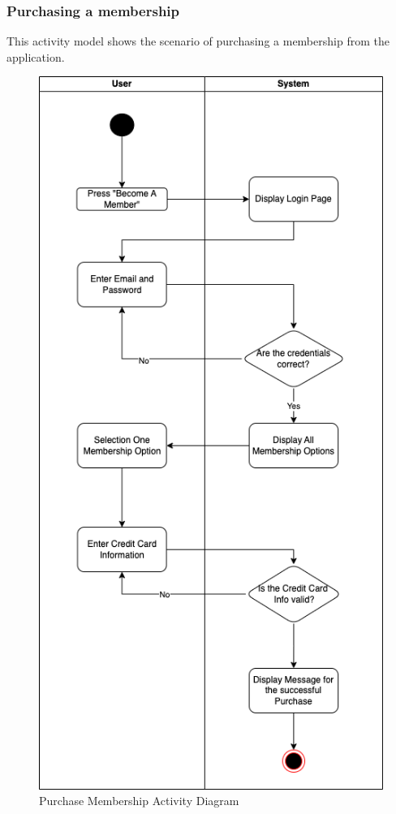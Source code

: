 \subsubsection{Purchasing a membership}
This activity model shows the scenario of purchasing a membership from the application.
\begin{figure}[H]
  \centering
  \includegraphics[scale = 0.55]{images/PurchaseMembershipActivity.png}
  \caption{Purchase Membership Activity Diagram}
  \label{fig:Purchase Membership Activity Diagram}
\end{figure}






